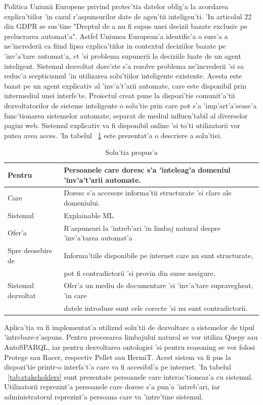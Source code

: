 \documentclass[12pt,a4paper,twoside]{report}
\begin{document}
Politica Uniunii Europene privind protec'tia datelor oblig'a la acordarea explica'tiilor 'in cazul r'aspunsurilor date de agen'tii inteligen'ti. 'In articolul 22 din GDPR se sus'tine "Dreptul de a nu fi supus unei decizii bazate exclusiv pe prelucrarea automat'a". Astfel Uniunea European'a identific'a o surs'a a ne'increderii ca fiind lipsa explica'tiilor in contextul deciziilor bazate pe 'inv'a'tare automat'a, c\ia t 'si problema supunerii la deciziile luate de un agent inteligent. Sistemul dezvoltat dore'ste s'a rezolve problema ne'increderii 'si sa reduc'a scepticismul 'in utilizarea solu'tiilor inteligente existente. Acesta este bazat pe un agent explicativ al 'inv'a't'arii automate, care este disponibil prin intermediul unei interfe'te. Proiectul creat pune la dispozi'tie comunit'a'tii dezvoltatorilor de sisteme inteligente o solu'tie prin care pot s'a 'imp'art'a'seasc'a func'tionarea sistemelor automate, separat de mediul influen'tabil al diverselor pagini web. Sistemul explicativ va fi disponibil online 'si to'ti utilizatorii vor putea avea acces. 'In tabelul ~\ref{tab:solution_table} este prezentat'a o descriere a solu'tiei.


\begin{table}[]
    \centering
    \begin{tabular}{l|l}
Pentru &  Persoanele care doresc s'a 'inteleag'a domeniul 'inv'a't'arii automate. \\
    \hline
Care & Doresc s'a acceseze informa'tii structurate 'si clare ale domeniului. \\
    \hline
Sistemul & Explainable ML\\
    \hline
Ofer'a & R'aspunsuri la 'intreb'ari 'in limbaj natural despre 'inv'a'tarea automat'a \\
\hline
Spre deosebire de & Informa'tiile disponibile pe internet care nu sunt structurate,\\
&  pot fi contradictorii 'si provin din surse nesigure.\\
\hline
Sistemul dezvoltat & Ofer'a un mediu de documentare 'si 'inv'a'tare supravegheat, 'in care \\
&  datele introduse sunt cele corecte 'si nu sunt contradictorii. \\
    \end{tabular}
     \caption{Solu'tia propus'a}
    \label{tab:solution_table}
\end{table}

Aplica'tia va fi implementat'a utiliz\ia nd solu'tii de dezvoltare a sistemelor de tipul 'intrebare-r'aspuns. Pentru procesarea limbajului natural se vor utiliza Quepy sau AutoSPARQL, iar pentru dezvoltarea ontologiei 'si pentru reasoning se vor folosi Protege sau Racer, respectiv Pellet sau HermiT. Acest sistem va fi pus la dispozi'tie printr-o interfa't'a care va fi accesibil'a pe internet. 'In tabelul ~\ref{tab:stakeholders} sunt prezentate persoanele care interac'tioneaz'a cu sistemul. Utilizatorii reprezint'a persoanele care doresc s'a pun'a 'intreb'ari, iar administratorul reprezint'a persoana care va 'intre'tine sistemul.
\end{document}
